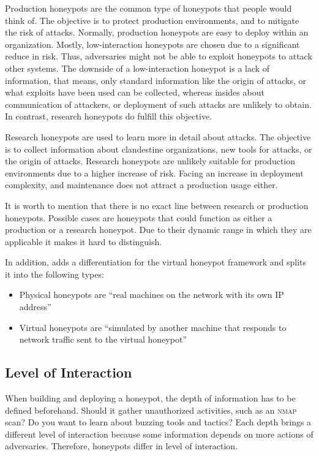Production honeypots are the common type of honeypots that people would think of.
The objective is to protect production environments, and to mitigate the risk of attacks.
Normally, production honeypots are easy to deploy within an organization.
Mostly, low-interaction honeypots are chosen due to a significant reduce in risk.
Thus, adversaries might not be able to exploit honeypots to attack other systems.
The downside of a low-interaction honeypot is a lack of information, that means, only standard information like the origin of attacks, or what exploits have been used can be collected, whereas insides about communication of attackers, or deployment of such attacks are unlikely to obtain.
In contrast, research honeypots do fulfill this objective. \cite{Spitzner2003}

Research honeypots are used to learn more in detail about attacks.
The objective is to collect information about clandestine organizations, new tools for attacks, or the origin of attacks.
Research honeypots are unlikely suitable for production environments due to a higher increase of risk.
Facing an increase in deployment complexity, and maintenance does not attract a production usage either. \cite{Spitzner2003}

It is worth to mention that there is no exact line between research or production honeypots.
Possible cases are honeypots that could function as either a production or a research honeypot.
Due to their dynamic range in which they are applicable it makes it hard to distinguish.

In addition, \citet{Provos2003} adds a differentiation for the virtual honeypot framework and splits it into the following types:

\begin{itemize}
    \item Physical honeypots are \enquote{real machines on the network with its own IP address} \cite{Provos2003}
    \item Virtual honeypots are \enquote{simulated by another machine that responds to network traffic sent to the virtual honeypot} \cite{Provos2003}
\end{itemize}

\subsection{Level of Interaction}
\label{subsec:interaction-honeypots}

When building and deploying a honeypot, the depth of information has to be defined beforehand.
Should it gather unauthorized activities, such as an \textsc{nmap} scan?
Do you want to learn about buzzing tools and tactics?
Each depth brings a different level of interaction because some information depends on more actions of adversaries.
Therefore, honeypots differ in level of interaction.

